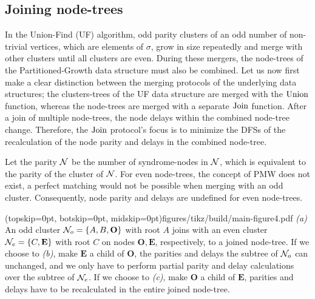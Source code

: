 \subsection{Joining node-trees}\label{sec:nodejoin}

In the Union-Find (UF) algorithm, odd parity clusters of an odd number of non-trivial vertices, which are elements of $\sigma$, grow in size repeatedly and merge with other clusters until all clusters are even. During these mergers, the node-trees of the Partitioned-Growth data structure must also be combined. Let us now first make a clear distinction between the merging protocols of the underlying data structures; the clusters-trees of the UF data structure are merged with the $\operatorname{Union}$ function, whereas the node-trees are merged with a separate $\operatorname{Join}$ function. After a join of multiple node-trees, the node delays within the combined node-tree change. Therefore, the $\operatorname{Join}$ protocol's focus is to minimize the DFSs of the recalculation of the node parity and delays in the combined node-tree. 

Let the parity $\mathcal{N}$ be the number of syndrome-nodes in $\mathcal{N}$, which is equivalent to the parity of the cluster of $\mathcal{N}$. For even node-trees, the concept of PMW does not exist, a perfect matching would not be possible when merging with an odd cluster. Consequently, node parity and delays are undefined for even node-trees. 

\Figure[hbt](topskip=0pt, botskip=0pt, midskip=0pt){figures/tikz/build/main-figure4.pdf}{
    \emph{(a)} An odd cluster $\mathcal{N}_o=\{A, B, \mathbf{O}\}$ with root $A$ joins with an even cluster $\mathcal{N}_e=\{C, \mathbf{E}\}$ with root $C$ on nodes $\mathbf{O}, \mathbf{E}$, respectively, to a joined node-tree. If we choose to \emph{(b)}, make $\mathbf{E}$ a child of $\mathbf{O}$, the parities and delays the subtree of $\mathcal{N}_o$ can unchanged, and we only have to perform partial parity and delay calculations over the subtree of $\mathcal{N}_e$. If we choose to \emph{(c)}, make $\mathbf{O}$ a child of $\mathbf{E}$, parities and delays have to be recalculated in the entire joined node-tree. \label{fig4}}

